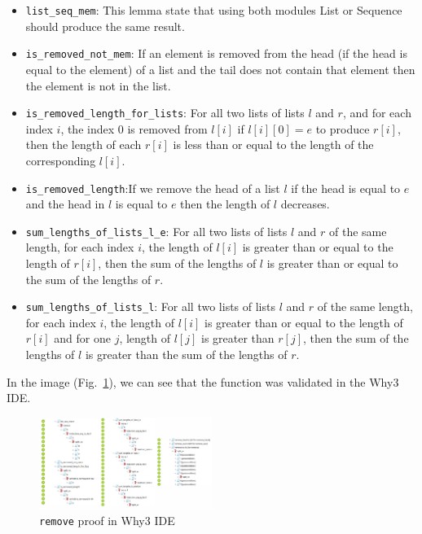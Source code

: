 \documentclass[runningheads]{llncs}
\begin{document}
\begin{itemize}
  \item \texttt{list\_seq\_mem}: This lemma state that using both modules List or Sequence should produce the same result.
  \item \texttt{is\_removed\_not\_mem}: If an element is removed from the head (if the head is equal to the element) of a list and the tail does not contain that element then the element is not in the list.
  \item \texttt{is\_removed\_length\_for\_lists}: For all two lists of lists $l$ and $r$, and for each index $i$, the index $0$ is removed from $l[i]$ if $l[i][0] = e$ to produce $r[i]$, then the length of each $r[i]$ is less than or equal to the length of the corresponding $l[i]$.
  \item \texttt{is\_removed\_length}:If we remove the head of a list $l$ if the head is equal to $e$ and the head in $l$ is equal to $e$ then the length of $l$ decreases.
  \item \texttt{sum\_lengths\_of\_lists\_l\_e}: For all two lists of lists $l$ and $r$ of the same length, for each index $i$, the length of $l[i]$ is greater than or equal to the length of $r[i]$, then the sum of the lengths of $l$ is greater than or equal to the sum of the lengths of $r$.
  \item \texttt{sum\_lengths\_of\_lists\_l}: For all two lists of lists $l$ and $r$ of the same length, for each index $i$, the length of $l[i]$ is greater than or equal to the length of $r[i]$ and for one $j$, length of $l[j]$ is greater than $r[j]$, then the sum of the lengths of $l$ is greater than the sum of the lengths of $r$.
\end{itemize}
In the image (Fig.~\ref{fig:Why3Remove}), we can see that the function was validated in the Why3 IDE.
\begin{figure}[htbp]
  \centering
  \includegraphics[width=0.5\textwidth]{images/removeWhy3IDE.png}
  \caption{\texttt{remove} proof in Why3 IDE}
  \label{fig:Why3Remove} 
\end{figure}
\end{document}

